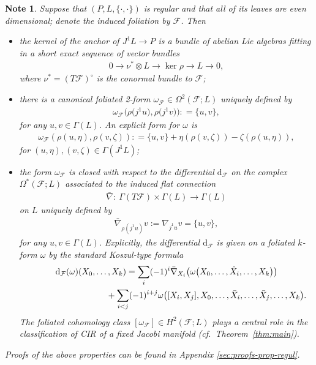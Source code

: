 \documentclass[pdftex]{sigma}
\numberwithin{equation}{section}
\newtheorem{Note}[Theorem]{Note}
\newcommand{\de}{\mathrm{d}} %
\newcommand{\JM}{(P,L,\{\cdot,\cdot\})} %
\begin{document}
\begin{Note}\label{obs:prop_jac_even}
Suppose that $\JM$ is regular and that all of its leaves are even dimensional; denote the induced foliation by $\mathcal{F}$. Then
 \begin{itemize}\itemsep=0pt
 \item the kernel of the anchor of $J^1L \to P$ is a bundle of abelian Lie algebras f\/itting in a short exact sequence of vector bundles
 \begin{gather} \label{eq:38}
 0 \to \nu^* \otimes L \to \ker \rho \to L \to 0,
 \end{gather}
 where $\nu^* = \left( T \mathcal{F}\right)^{\circ}$ is the conormal bundle to $\mathcal{F}$;
 \item there is a canonical foliated 2-form $\omega_{\mathcal{F}} \in\Omega^2(\mathcal{F};L)$ uniquely def\/ined by
 \begin{gather} \label{eq:29}
 \omega_{\mathcal{F}}\big(\rho\big(j^1 u\big), \rho\big(j^1 v\big)\big) : = \{u,v\},
 \end{gather}
 for any $u,v \in \Gamma(L)$. An explicit form for $\omega$ is
 \begin{gather*}
 \omega_{\mathcal{F}}(\rho(u,\eta),\rho(v,\zeta)) : = \{u,v\} + \eta(\rho(v,\zeta)) - \zeta(\rho(u,\eta)),
 \end{gather*}
 for $(u,\eta), (v,\zeta) \in \Gamma(J^1 L)$;
\item the form $\omega_{\mathcal{F}}$ is closed with respect to the dif\/ferential $\de_{\mathcal{F}}$ on the complex $\Omega^* (\mathcal{F};L)$ associated to the induced f\/lat connection
 \begin{gather*}%
 \bar{\nabla} \colon \ \Gamma(T \mathcal{F}) \times \Gamma(L) \to \Gamma(L)
 \end{gather*}
 on $L$ uniquely def\/ined by
 \begin{gather} \label{eq:26}
 \bar{\nabla}_{\rho(j^1u)} v := \nabla_{j^1 u}v = \{u,v\},
 \end{gather}
 for any $u,v \in \Gamma(L)$. Explicitly, the dif\/ferential $\de_{\mathcal{F}}$ is given on a foliated $k$-form $\omega$ by the standard Koszul-type formula
 \begin{gather*}
 \de_{\mathcal{F}}(\omega)(X_0,\ldots,X_k)= \sum_i(-1)^i\bar\nabla_{X_i}\big(\omega\big(X_0,\ldots,\hat X_i,\ldots, X_k\big)\big)\\
\hphantom{\de_{\mathcal{F}}(\omega)(X_0,\ldots,X_k)=}{} +\sum_{i<j}(-1)^{i+j}\omega\big([X_i,X_j], X_0,\ldots,\bar X_i,\ldots, \bar X_j,\ldots, X_k \big).
\end{gather*}
The foliated cohomology class $ [\omega_{\mathcal{F}}]\in H^2(\mathcal{F};L)$ plays a central role in the classif\/ication of CIR of a f\/ixed Jacobi manifold (cf.\ Theorem~\ref{thm:main}).
 \end{itemize}
Proofs of the above properties can be found in Appendix \ref{sec:proofs-prop-regul}.
\end{Note}
\end{document}
